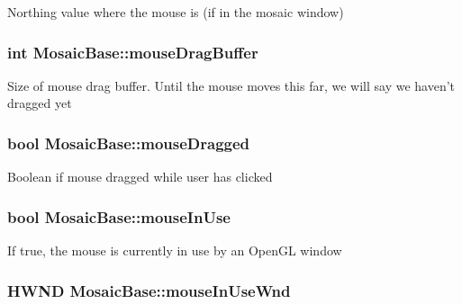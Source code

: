 \label{class_mosaic_base_a6c6508870f5713bbccb1363e6795c27d}
Northing value where the mouse is (if in the mosaic window) \hypertarget{class_mosaic_base_a7bdf4216affd6e30fc134a3eb300861b}{
\subsubsection[{mouseDragBuffer}]{\setlength{\rightskip}{0pt plus 5cm}int {\bf MosaicBase::mouseDragBuffer}}}
\label{class_mosaic_base_a7bdf4216affd6e30fc134a3eb300861b}
Size of mouse drag buffer. Until the mouse moves this far, we will say we haven't dragged yet \hypertarget{class_mosaic_base_a4bfbec52e7e71d6e89b62f45384c330b}{
\subsubsection[{mouseDragged}]{\setlength{\rightskip}{0pt plus 5cm}bool {\bf MosaicBase::mouseDragged}}}
\label{class_mosaic_base_a4bfbec52e7e71d6e89b62f45384c330b}
Boolean if mouse dragged while user has clicked \hypertarget{class_mosaic_base_a0cdf3eb3384123e976d0d3855e5f620c}{
\subsubsection[{mouseInUse}]{\setlength{\rightskip}{0pt plus 5cm}bool {\bf MosaicBase::mouseInUse}}}
\label{class_mosaic_base_a0cdf3eb3384123e976d0d3855e5f620c}
If true, the mouse is currently in use by an OpenGL window \hypertarget{class_mosaic_base_a9f29d02425823a27e125921b013d6999}{
\subsubsection[{mouseInUseWnd}]{\setlength{\rightskip}{0pt plus 5cm}HWND {\bf MosaicBase::mouseInUseWnd}}}
